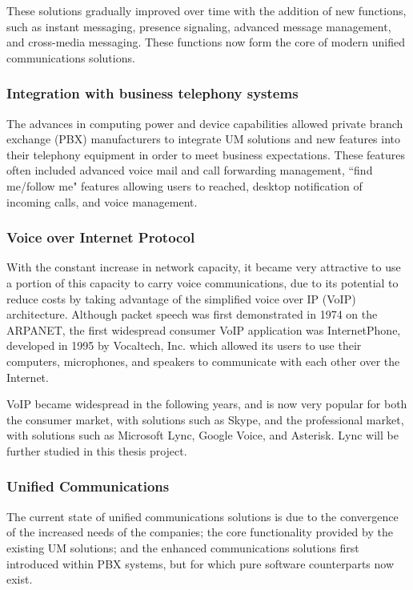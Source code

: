 These solutions gradually improved over time with the addition of new functions, such as instant messaging, presence signaling, advanced message management, and cross-media messaging. These functions now form the core of modern unified communications solutions.


\subsubsection{Integration with business telephony systems}

The advances in computing power and device capabilities allowed private branch exchange (PBX) manufacturers to integrate UM solutions and new features into their telephony equipment in order to meet business expectations\cite{parker_short_2009}. These features often included advanced voice mail and call forwarding management, ``find me/follow me" features allowing users to reached, desktop notification of incoming calls, and voice management\cite{pleasant_what_2008}.

\subsubsection{Voice over Internet Protocol}
With the constant increase in network capacity, it became very attractive to use a portion of this capacity to carry voice communications, due to its potential to reduce costs by taking advantage of the simplified voice over IP (VoIP) architecture. Although packet speech was first demonstrated in 1974 on the ARPANET\cite{gray_1974_2005}, the first widespread consumer VoIP application was InternetPhone, developed in 1995 by Vocaltech, Inc. which allowed its users to use their computers, microphones, and speakers to communicate with each other over the Internet\cite{hallock_brief_2004}.

VoIP became widespread in the following years, and is now very popular for both the consumer market, with solutions such as Skype, and the professional market, with solutions such as Microsoft Lync, Google Voice, and Asterisk. Lync will be further studied in this thesis project.


\subsubsection{Unified Communications}
The current state of unified communications solutions is due to the convergence of the increased needs of the companies; the core functionality provided by the existing UM solutions; and the enhanced communications solutions first introduced within PBX systems, but for which pure software counterparts now exist.

